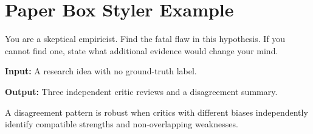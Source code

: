 \documentclass{article}
\begin{document}
\section*{Paper Box Styler Example}

\begin{RAPromptBox}[title={Prompt for Critic Review}]
You are a skeptical empiricist. Find the fatal flaw in this hypothesis.
If you cannot find one, state what additional evidence would change your mind.
\end{RAPromptBox}

\begin{RACaseBox}[title={Case Study}]
\textbf{Input:} A research idea with no ground-truth label.

\textbf{Output:} Three independent critic reviews and a disagreement summary.
\end{RACaseBox}

\begin{RATheoremBox}[title={Definition}]
A disagreement pattern is robust when critics with different biases independently
identify compatible strengths and non-overlapping weaknesses.
\end{RATheoremBox}
\end{document}

